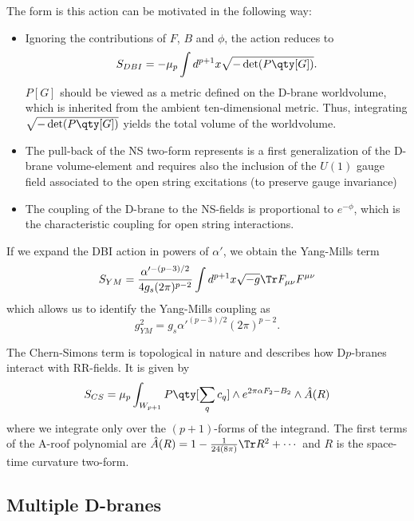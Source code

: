 The form  is this action can be motivated in the following way:
\begin{itemize}
  \item Ignoring the contributions of $F$, $B$ and $\phi$, the action reduces to 
   \begin{equation}
  S_{DBI}= -\mu_p \int d^{p+1} x \sqrt{-\det(P\qty[G])}.
   \end{equation}
   $P[G]$ should be viewed as a metric defined on the D-brane worldvolume, which is inherited from the ambient ten-dimensional metric.
   Thus, integrating $\sqrt{-\det(P\qty[G])}$ yields the total volume of the worldvolume.

 \item The pull-back of the NS two-form represents is a first generalization of the D-brane volume-element and requires also the inclusion of the $U(1)$ gauge field associated to the open string excitations (to preserve gauge invariance)

  \item The coupling of the D-brane to the NS-fields is proportional to $e^{-\phi}$, which is the characteristic coupling for open string interactions.
\end{itemize}

If we expand the DBI action in powers of $\alpha'$, we obtain the Yang-Mills term
\begin{equation}
  S_{YM} = \frac{\alpha'^{-(p-3)/2}}{4g_s (2\pi)^{p-2}} \int d^{p+1} x \sqrt {-g} \Tr F_{\mu\nu} F^{\mu\nu}
\end{equation}
which allows us to identify the Yang-Mills coupling as 
\begin{equation}
g^2_{YM} = g_s \alpha'^{(p-3)/2}(2\pi)^{p-2}.
\end{equation}

The Chern-Simons term is topological in nature and describes how D$p$-branes interact with RR-fields.
It is given by
\begin{equation}
  S_{CS}= \mu_p \int_{W_{p+1}} P\qty[\sum_q c_q]\wedge e^{2\pi\alpha F_2 -B_2}\wedge \hat A (R)
\end{equation}
where we integrate only over the $(p+1)$-forms of the integrand. 
The first terms of the A-roof polynomial are $\hat A(R) = 1- \frac{1}{24(8\pi)} \Tr R^2+\cdots$ and $R$ is the space-time curvature two-form.

\subsection{Multiple D-branes}

